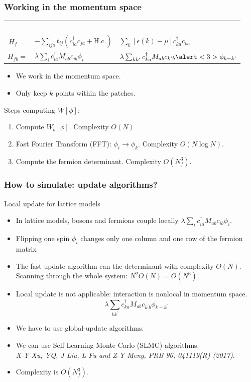 \documentclass[xcolor=table, 10pt, aspectratio=43]{beamer}
\renewcommand{\arraystretch}{1.5}
\begin{document}
\begin{frame}
  \frametitle{Working in the momentum space}
  \begin{table}
    \renewcommand{\arraystretch}{2.5}
  \begin{tabularx}{\columnwidth}{cxx}
    & \textcolor{white}{Real space}
    & \textcolor{white}{Momentum space}\\
    $H_f = $ & $-\sum_{ija}t_{ij}(c_{ia}^\dagger c_{ja}+\text{H.c.})$
    & $\sum_k[\epsilon(k)-\mu]c_{ka}^\dagger c_{ka}$\\
    $H_{fb} = $
    & $\lambda\sum_ic_{ia}^\dagger M_{ab}c_{ib}\phi_i$
    & $\lambda\sum_{kk^\prime}c_{ka}^\dagger M_{ab}c_{k^\prime b}
    \alert<3>{\phi_{k-k^\prime}}$
  \end{tabularx}
  \end{table}
  \begin{itemize}
    \item We work in the momentum space.
    \item Only keep $k$ points within the patches.
  \end{itemize}
  Steps computing $W[\phi]$:
  \begin{enumerate}
    \item<2-4> Compute $W_b[\phi]$. Complexity $O(N)$
    \item<3-4> Fast Fourier Transform (FFT): $\phi_i\rightarrow\phi_k$. Complexity $O(N\log N)$.
    \item<4-5> Compute the fermion determinant. Complexity $O(N_f^3)$.
  \end{enumerate}
\end{frame}

\begin{frame}
  \frametitle{How to simulate: update algorithms?}
  \begin{block}{Local update for lattice models}
    \begin{itemize}
      \item In lattice models, bosons and fermions couple locally $\lambda\sum_ic_{ia}^\dagger M_{ab}c_{ib}\phi_i$.
      \item Flipping one spin $\phi_i$ changes only one column and one row of the fermion matrix
      \item The fast-update algorithm can the determinant with complexity $O(N)$. Scanning through the whole system: $N^2O(N)=O(N^3)$.
    \end{itemize}
  \end{block}
  \begin{itemize}
    \item Local update is not applicable: interaction is nonlocal in momentum space.
    \[\lambda\sum_{kk^\prime}c_{ka}^\dagger M_{ab}c_{k^\prime b}\phi_{k-k^\prime}\]
    \item We have to use global-update algorithms.
    \item We can use Self-Learning Monte Carlo (SLMC) algorithms.\\
    \emph{\small X-Y Xu, YQ, J Liu, L Fu and Z-Y Meng, PRB 96, 041119(R) (2017).}
    \item Complexity is $O(N_f^3)$.
  \end{itemize}
\end{frame}
\end{document}
